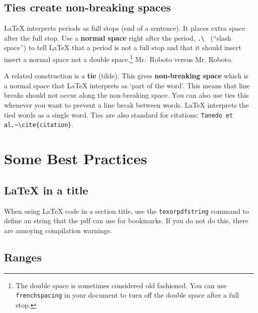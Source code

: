 \subsection{Ties create non-breaking spaces}

\LaTeX{} interprets periods as full stops (end of a sentence). It places extra space after the full stop. Use a \textbf{normal space} right after the period, \verb!.\ ! (``slash space'') to tell \LaTeX{} that a period is not a full stop and that it should insert insert a normal space not a double space.\footnote{The double space is sometimes considered old fashioned. You can use \texttt{frenchspacing} in your document to turn off the double space after a full stop.} Mr.\ Roboto versus Mr. Roboto. 


A related construction is a \textbf{tie} (tilde). This gives \textbf{non-breaking space} which is a normal space that \LaTeX{} interprets as `part of the word'. This means that line breaks should not occur along the non-breaking space.
% 
You can also use ties this whenever you want to prevent a line break between words. \LaTeX{} interprets the tied words as a single word.
% 
Ties are also standard for citations: \verb!Tanedo et al.~\cite{citation}!. 




\section{Some Best Practices}

\subsection{\texorpdfstring{\LaTeX{} in a title}{LaTeX in a title}}

When using \LaTeX{} code in a section title, use the \texttt{texorpdfstring} command to define an  string that the pdf can use for bookmarks. If you do not do this, there are annoying compilation warnings.


\subsection{Ranges}

